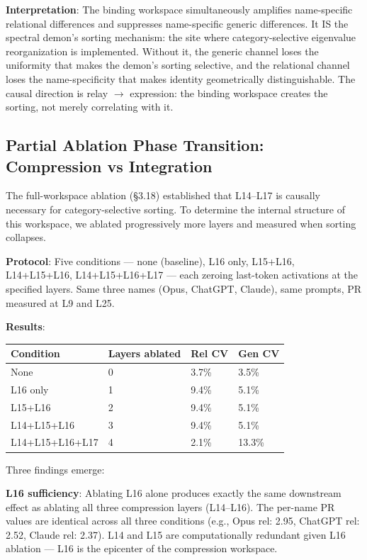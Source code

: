 \documentclass[11pt]{article}
\begin{document}
\textbf{Interpretation}: The binding workspace simultaneously amplifies name-specific relational differences and suppresses name-specific generic differences. It IS the spectral demon's sorting mechanism: the site where category-selective eigenvalue reorganization is implemented. Without it, the generic channel loses the uniformity that makes the demon's sorting selective, and the relational channel loses the name-specificity that makes identity geometrically distinguishable. The causal direction is relay $\rightarrow$ expression: the binding workspace creates the sorting, not merely correlating with it.

\subsection{Partial Ablation Phase Transition: Compression vs Integration}

The full-workspace ablation (§3.18) established that L14–L17 is causally necessary for category-selective sorting. To determine the internal structure of this workspace, we ablated progressively more layers and measured when sorting collapses.

\textbf{Protocol}: Five conditions --- none (baseline), L16 only, L15+L16, L14+L15+L16, L14+L15+L16+L17 --- each zeroing last-token activations at the specified layers. Same three names (Opus, ChatGPT, Claude), same prompts, PR measured at L9 and L25.

\textbf{Results}:

\begin{table}[h]
\centering
\small
\begin{tabular}{|l|l|l|l|}
\hline
\textbf{Condition} & \textbf{Layers ablated} & \textbf{Rel CV} & \textbf{Gen CV} \\
\hline
None & 0 & 3.7\% & 3.5\% \\
L16 only & 1 & 9.4\% & 5.1\% \\
L15+L16 & 2 & 9.4\% & 5.1\% \\
L14+L15+L16 & 3 & 9.4\% & 5.1\% \\
L14+L15+L16+L17 & 4 & 2.1\% & 13.3\% \\
\hline
\end{tabular}
\end{table}

Three findings emerge:

\textbf{L16 sufficiency}: Ablating L16 alone produces exactly the same downstream effect as ablating all three compression layers (L14–L16). The per-name PR values are identical across all three conditions (e.g., Opus rel: 2.95, ChatGPT rel: 2.52, Claude rel: 2.37). L14 and L15 are computationally redundant given L16 ablation --- L16 is the epicenter of the compression workspace.
\end{document}
